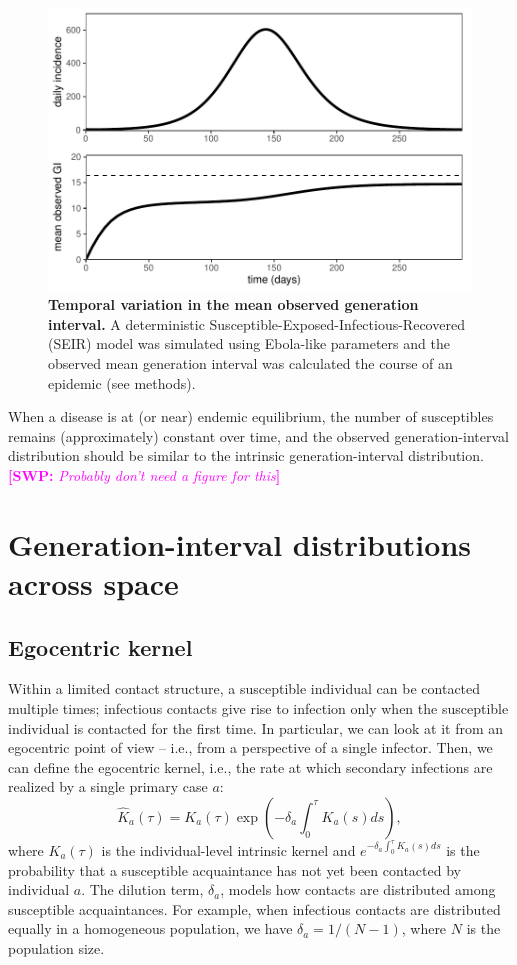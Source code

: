 \documentclass[12pt]{article}
\newcommand{\comment}[3]{\textcolor{#1}{\textbf{[#2: }\textsl{#3}\textbf{]}}}
\newcommand{\swp}[1]{\comment{magenta}{SWP}{#1}}
\begin{document}
\begin{figure}
\includegraphics[width=\textwidth]{../fig/temporal_effect.pdf}
\caption{\textbf{Temporal variation in the mean observed generation interval.}
A deterministic Susceptible-Exposed-Infectious-Recovered (SEIR) model was simulated using Ebola-like parameters and the observed mean generation interval was calculated the course of an epidemic (see methods).
}
\label{fig:censor}
\end{figure}

When a disease is at (or near) endemic equilibrium, the number of susceptibles remains (approximately) constant over time, and the observed generation-interval distribution should be similar to the intrinsic generation-interval distribution.
\swp{Probably don't need a figure for this}

\section{Generation-interval distributions across space}

\subsection{Egocentric kernel}

Within a limited contact structure, a susceptible individual can be contacted multiple times;
infectious contacts give rise to infection only when the susceptible individual is contacted for the first time.
In particular, we can look at it from an egocentric point of view -- i.e., from a perspective of a single infector.
Then, we can define the egocentric kernel, i.e., the rate at which secondary infections are realized by a single primary case $a$:
\begin{equation}
\hat{K}_a(\tau) = K_a(\tau) \exp \left(- \delta_a \int_0^\tau K_a(s) ds\right),
\end{equation}
where $K_a(\tau)$ is the individual-level intrinsic kernel and $e^{- \delta_a \int_0^\tau K_a(s) ds}$ is the probability that a susceptible acquaintance has not yet been contacted by individual $a$.
The dilution term, $\delta_a$, models how contacts are distributed among susceptible acquaintances.
For example, when infectious contacts are distributed equally in a homogeneous population, we have $\delta_a = 1/(N-1)$, where $N$ is the population size.
\end{document}
